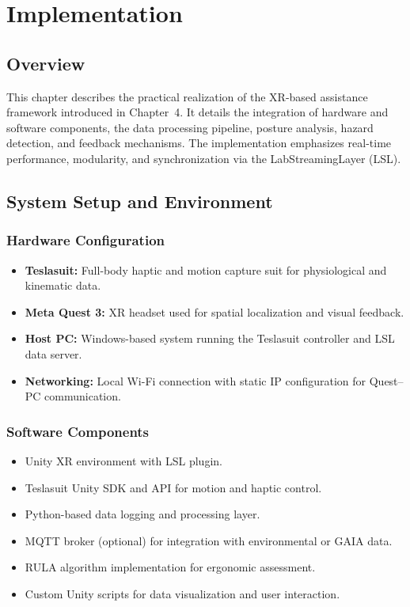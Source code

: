 \chapter{Implementation}

\section{Overview}
This chapter describes the practical realization of the XR-based assistance framework introduced in Chapter~4. It details the integration of hardware and software components, the data processing pipeline, posture analysis, hazard detection, and feedback mechanisms. The implementation emphasizes real-time performance, modularity, and synchronization via the LabStreamingLayer (LSL).

\section{System Setup and Environment}
\subsection{Hardware Configuration}
\begin{itemize}
    \item \textbf{Teslasuit:} Full-body haptic and motion capture suit for physiological and kinematic data.
    \item \textbf{Meta Quest 3:} XR headset used for spatial localization and visual feedback.
    \item \textbf{Host PC:} Windows-based system running the Teslasuit controller and LSL data server.
    \item \textbf{Networking:} Local Wi-Fi connection with static IP configuration for Quest–PC communication.
\end{itemize}

\subsection{Software Components}
\begin{itemize}
    \item Unity XR environment with LSL plugin.
    \item Teslasuit Unity SDK and API for motion and haptic control.
    \item Python-based data logging and processing layer.
    \item MQTT broker (optional) for integration with environmental or GAIA data.
    \item RULA algorithm implementation for ergonomic assessment.
    \item Custom Unity scripts for data visualization and user interaction.
\end{itemize}

